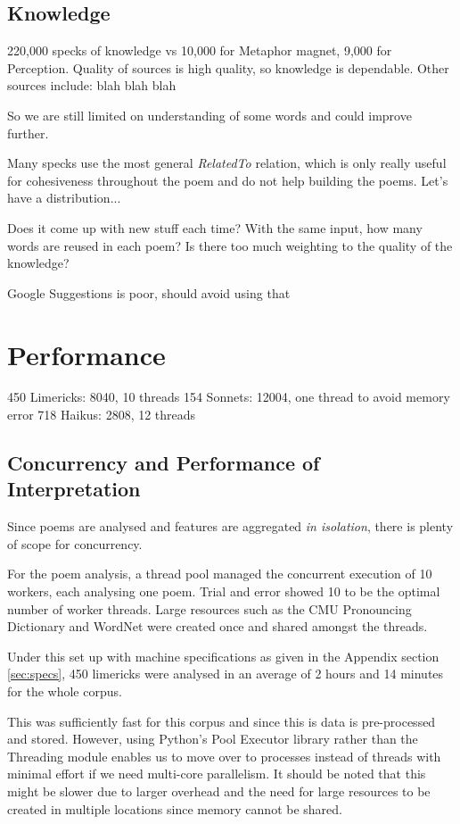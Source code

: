 \subsection{Knowledge}
220,000 specks of knowledge vs 10,000 for Metaphor magnet, 9,000 for Perception.
Quality of sources is high quality, so knowledge is dependable.
Other sources include:
blah
blah
blah

So we are still limited on understanding of some words and could improve further.

Many specks use the most general \textit{RelatedTo} relation, which is only really useful for cohesiveness throughout the poem and do not help building the poems. Let's have a distribution...

Does it come up with new stuff each time? With the same input, how many words are reused in each poem? Is there too much weighting to the quality of the knowledge?

Google Suggestions is poor, should avoid using that

\section{Performance}

450 Limericks: 8040, 10 threads
154 Sonnets: 12004, one thread to avoid memory error
718 Haikus: 2808, 12 threads


\subsection{Concurrency and Performance of Interpretation}
\label{sec:interpret-perf}

Since poems are analysed and features are aggregated \textit{in isolation}, there is plenty of scope for concurrency.

For the poem analysis, a thread pool managed the concurrent execution of 10 workers, each analysing one poem. Trial and error showed 10 to be the optimal number of worker threads. Large resources such as the CMU Pronouncing Dictionary and WordNet were created once and shared amongst the threads.

Under this set up with machine specifications as given in the Appendix section \ref{sec:specs}, 450 limericks were analysed in an average of 2 hours and 14 minutes for the whole corpus.

This was sufficiently fast for this corpus and since this is data is pre-processed and stored. However, using Python's Pool Executor library rather than the Threading module enables us to move over to processes instead of threads with minimal effort if we need multi-core parallelism. It should be noted that this might be slower due to larger overhead and the need for large resources to be created in multiple locations since memory cannot be shared.

